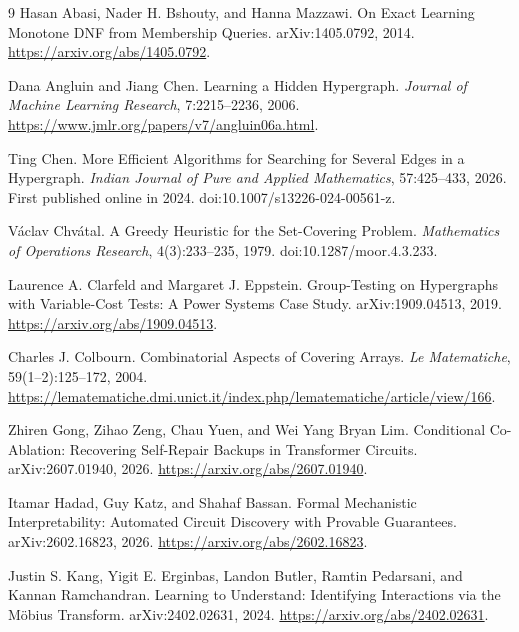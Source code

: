 \begin{thebibliography}{9}
Hasan Abasi, Nader H. Bshouty, and Hanna Mazzawi.
\newblock On Exact Learning Monotone DNF from Membership Queries.
\newblock arXiv:1405.0792, 2014. \url{https://arxiv.org/abs/1405.0792}.

Dana Angluin and Jiang Chen.
\newblock Learning a Hidden Hypergraph.
\newblock \emph{Journal of Machine Learning Research}, 7:2215--2236, 2006.
\newblock \url{https://www.jmlr.org/papers/v7/angluin06a.html}.

Ting Chen.
\newblock More Efficient Algorithms for Searching for Several Edges in a Hypergraph.
\newblock \emph{Indian Journal of Pure and Applied Mathematics}, 57:425--433, 2026.
\newblock First published online in 2024. doi:10.1007/s13226-024-00561-z.

V\'aclav Chv\'atal.
\newblock A Greedy Heuristic for the Set-Covering Problem.
\newblock \emph{Mathematics of Operations Research}, 4(3):233--235, 1979.
\newblock doi:10.1287/moor.4.3.233.

Laurence A. Clarfeld and Margaret J. Eppstein.
\newblock Group-Testing on Hypergraphs with Variable-Cost Tests: A Power Systems Case Study.
\newblock arXiv:1909.04513, 2019. \url{https://arxiv.org/abs/1909.04513}.

Charles J. Colbourn.
\newblock Combinatorial Aspects of Covering Arrays.
\newblock \emph{Le Matematiche}, 59(1--2):125--172, 2004.
\newblock \url{https://lematematiche.dmi.unict.it/index.php/lematematiche/article/view/166}.

Zhiren Gong, Zihao Zeng, Chau Yuen, and Wei Yang Bryan Lim.
\newblock Conditional Co-Ablation: Recovering Self-Repair Backups in Transformer Circuits.
\newblock arXiv:2607.01940, 2026. \url{https://arxiv.org/abs/2607.01940}.

Itamar Hadad, Guy Katz, and Shahaf Bassan.
\newblock Formal Mechanistic Interpretability: Automated Circuit Discovery with Provable Guarantees.
\newblock arXiv:2602.16823, 2026. \url{https://arxiv.org/abs/2602.16823}.

Justin S. Kang, Yigit E. Erginbas, Landon Butler, Ramtin Pedarsani, and Kannan Ramchandran.
\newblock Learning to Understand: Identifying Interactions via the M\"obius Transform.
\newblock arXiv:2402.02631, 2024. \url{https://arxiv.org/abs/2402.02631}.
\end{thebibliography}

